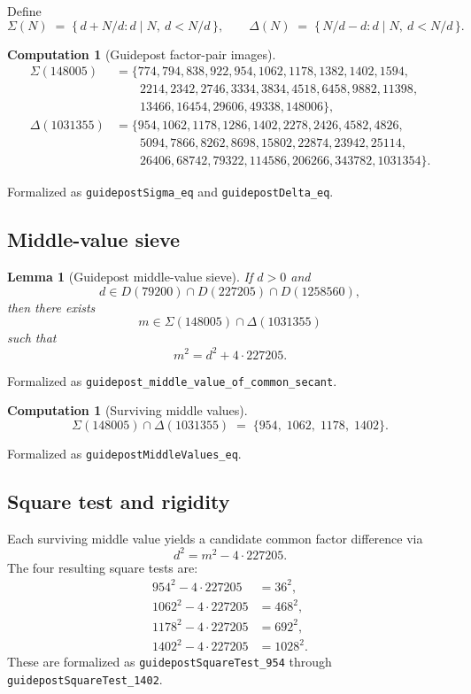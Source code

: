 \documentclass[11pt]{article}
\theoremstyle{plainbreak}
\newtheorem{lemma}[theorem]{Lemma}
\theoremstyle{defbreak}
\newtheorem{computation}[theorem]{Computation}
\begin{document}
Define
\[
  \Sigma(N) \;=\; \{\,d + N/d : d\mid N,\ d < N/d\,\},
  \qquad
  \Delta(N) \;=\; \{\,N/d - d : d\mid N,\ d < N/d\,\}.
\]

\begin{computation}[Guidepost factor-pair images]\label{comp:images}
\begin{align*}
  \Sigma(148005) &= \{774, 794, 838, 922, 954, 1062, 1178, 1382, 1402, 1594,\\
  &\qquad 2214, 2342, 2746, 3334, 3834, 4518, 6458, 9882, 11398,\\
  &\qquad 13466, 16454, 29606, 49338, 148006\},\\[4pt]
  \Delta(1031355) &= \{954, 1062, 1178, 1286, 1402, 2278, 2426, 4582, 4826,\\
  &\qquad 5094, 7866, 8262, 8698, 15802, 22874, 23942, 25114,\\
  &\qquad 26406, 68742, 79322, 114586, 206266, 343782, 1031354\}.
\end{align*}
\end{computation}
\noindent Formalized as \texttt{guidepostSigma\_eq} and
\texttt{guidepostDelta\_eq}.

\subsection{Middle-value sieve}

\begin{lemma}[Guidepost middle-value sieve]\label{lem:middle}
If $d>0$ and
\[
  d \in D(79200)\cap D(227205)\cap D(1258560),
\]
then there exists
\[
  m \in \Sigma(148005)\cap \Delta(1031355)
\]
such that
\[
  m^2 = d^2 + 4\cdot 227205.
\]
\end{lemma}
\noindent Formalized as
\texttt{guidepost\_middle\_value\_of\_common\_secant}.

\begin{computation}[Surviving middle values]\label{comp:middle}
\[
  \Sigma(148005)\cap\Delta(1031355)
  \;=\;
  \{954,\;1062,\;1178,\;1402\}.
\]
\end{computation}
\noindent Formalized as \texttt{guidepostMiddleValues\_eq}.

\subsection{Square test and rigidity}

Each surviving middle value yields a candidate common factor difference via
\[
  d^2 = m^2 - 4\cdot 227205.
\]
The four resulting square tests are:
\begin{align*}
  954^2 - 4\cdot 227205 &= 36^2, \\
  1062^2 - 4\cdot 227205 &= 468^2, \\
  1178^2 - 4\cdot 227205 &= 692^2, \\
  1402^2 - 4\cdot 227205 &= 1028^2.
\end{align*}
These are formalized as \texttt{guidepostSquareTest\_954} through
\texttt{guidepostSquareTest\_1402}.
\end{document}
